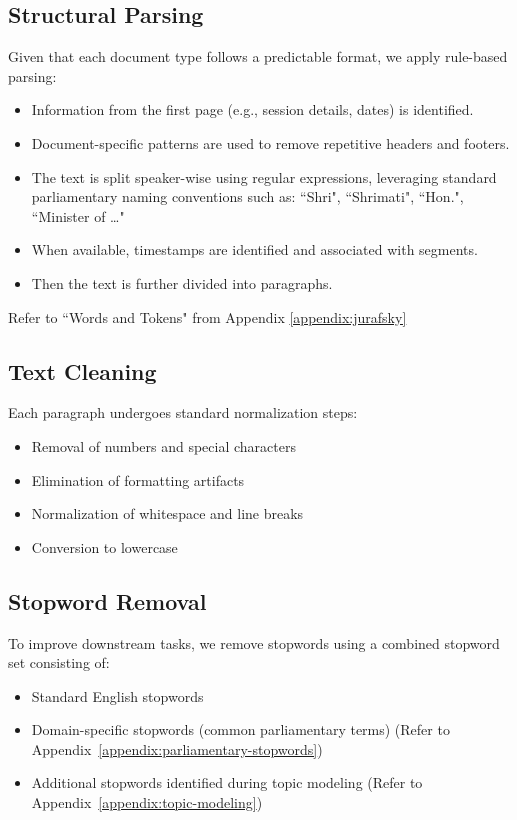 \documentclass{report}
\begin{document}
\subsection{Structural Parsing}
Given that each document type follows a predictable format, we apply rule-based parsing:
\begin{itemize}
    \item Information from the first page (e.g., session details, dates) is identified.
    \item Document-specific patterns are used to remove repetitive headers and footers.
    \item The text is split speaker-wise using regular expressions, leveraging standard parliamentary naming conventions such as: ``Shri", ``Shrimati", ``Hon.", ``Minister of …"
    \item When available, timestamps are identified and associated with segments.
    \item Then the text is further divided into paragraphs.
\end{itemize}
Refer to ``Words and Tokens" from Appendix \ref{appendix:jurafsky}

\subsection{Text Cleaning}
Each paragraph undergoes standard normalization steps:
\begin{itemize}
    \item Removal of numbers and special characters
    \item Elimination of formatting artifacts
    \item Normalization of whitespace and line breaks
    \item Conversion to lowercase
\end{itemize}

\subsection{Stopword Removal}
To improve downstream tasks, we remove stopwords using a combined stopword set consisting of:
\begin{itemize}
    \item Standard English stopwords
    \item Domain-specific stopwords (common parliamentary terms) (Refer to Appendix~\ref{appendix:parliamentary-stopwords})
    \item Additional stopwords identified during topic modeling (Refer to Appendix~\ref{appendix:topic-modeling})
\end{itemize}
\end{document}
